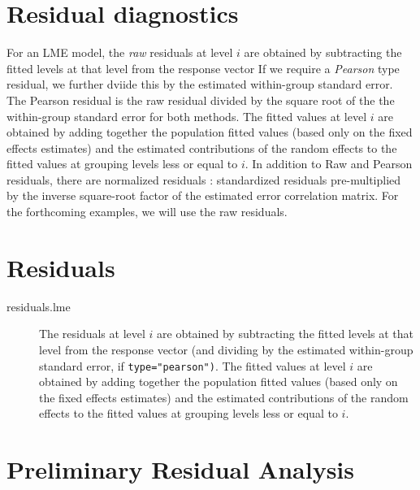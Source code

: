 \documentclass[12pt, a4paper]{report}
\theoremstyle{plain}
\theoremstyle{definition}
\theoremstyle{remark}
\begin{document}
		
		
		

	\section{Residual diagnostics} %

	
	For an LME model, the \textit{raw} residuals at level $i$ are obtained by subtracting the fitted levels at that level from the response vector If we require a \textit{Pearson} type residual, we further dviide this by the estimated within-group standard error. The Pearson residual is the raw residual divided by the square root of the the within-group standard error for both methods. The fitted values at level $i$ are obtained by adding together the population fitted values (based only on the fixed effects estimates) and the estimated contributions of the random effects to the fitted values at grouping levels less or equal to $i$. In addition to Raw and Pearson residuals, there are normalized residuals : standardized residuals pre-multiplied by the inverse square-root factor of the estimated error correlation matrix. For the forthcoming examples, we will use the raw residuals.
	
	
	\section*{Residuals}
	
	\begin{description}
		\item[residuals.lme] 
		The residuals at level $i$ are obtained by subtracting the fitted levels at that level from the response
		vector (and dividing by the estimated within-group standard error, if \texttt{type="pearson")}. The fitted
		values at level $i$ are obtained by adding together the population fitted values (based only on the
		fixed effects estimates) and the estimated contributions of the random effects to the fitted values at
		grouping levels less or equal to $i$.
	\end{description}

	\section*{Preliminary Residual Analysis }
	
\end{document}
